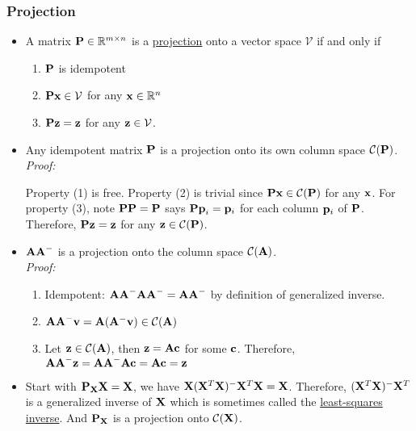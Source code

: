 \subsubsection*{Projection}
\begin{itemize}
	\item A matrix $\mathbf{P} \in \mathbb{R}^{m \times n}$ is a \underline{projection} onto a vector space $\mathcal{V}$ if and only if
	    \begin{enumerate}
	    	\item $\mathbf{P}$ is idempotent
	    	\item $\mathbf{Px} \in \mathcal{V}$ for any $\mathbf{x} \in \mathbb{R}^n$
	    	\item $\mathbf{Pz = z}$ for any $\mathbf{z} \in \mathcal{V}$.
	    \end{enumerate}
    \item Any idempotent matrix $\mathbf{P}$ is a projection onto its own column space $\mathcal{C}(\mathbf{P})$.\\
    {\it Proof:}
    \begin{pf}
    Property (1) is free.  Property (2) is trivial since $\mathbf{Px} \in \mathcal{C}(\mathbf{P})$ for any $\mathbf{x}$.
    For property (3), note $\mathbf{PP=P}$ says $\mathbf{Pp}_i = \mathbf{p}_i$ for each column $\mathbf{p}_i$ of $\mathbf{P}$.  Therefore, $\mathbf{Pz = z}$ for any $\mathbf{z} \in \mathcal{C}(\mathbf{P})$.
    \end{pf}
	\item $\mathbf{AA}^-$ is a projection onto the column space $\mathcal{C}(\mathbf{A})$.\\
	{\it Proof:}
	\begin{pf}
		\begin{enumerate}
			\item Idempotent: $\mathbf{AA}^- \mathbf{AA}^- = \mathbf{AA}^-$ by definition of generalized inverse.
			\item $\mathbf{AA}^- \mathbf{v} = \mathbf{A}(\mathbf{A}^-\mathbf{v}) \in \mathcal{C}(\mathbf{A})$
			\item Let $\mathbf{z} \in \mathcal{C}(\mathbf{A})$, then $\mathbf{z} = \mathbf{Ac}$ for some $\mathbf{c}$.  
			Therefore, $\mathbf{AA}^- \mathbf{z} = \mathbf{AA}^- \mathbf{Ac} = \mathbf{Ac} = \mathbf{z}$
		\end{enumerate}
	\end{pf}
	\item Start with $\mathbf{P_X X = X}$, we have $\mathbf{X}(\mathbf{X}^T \mathbf{X})^- \mathbf{X}^T \mathbf{X} = \mathbf{X}$. Therefore, $(\mathbf{X}^T \mathbf{X})^- \mathbf{X}^T$ is a generalized inverse of $\mathbf{X}$ which is sometimes called the \underline{least-squares inverse}.  And $\mathbf{P}_{\mathbf{X}}$ is a projection onto $\mathcal{C}(\mathbf{X})$.

\end{itemize}
